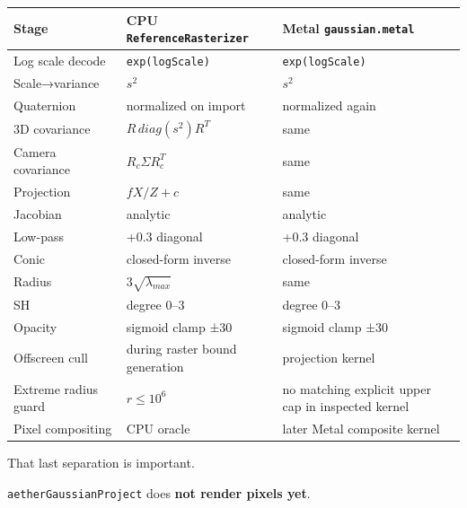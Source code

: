 {\def\LTcaptype{none} %
\begin{longtable}[]{@{}
  >{\raggedright\arraybackslash}p{}
  >{\raggedright\arraybackslash}p{}
  >{\raggedright\arraybackslash}p{}@{}}
\toprule\noalign{}
\begin{minipage}[b]{\linewidth}\raggedright
Stage
\end{minipage} & \begin{minipage}[b]{\linewidth}\raggedright
CPU \texttt{ReferenceRasterizer}
\end{minipage} & \begin{minipage}[b]{\linewidth}\raggedright
Metal \texttt{gaussian.metal}
\end{minipage} \\
\midrule\noalign{}
\endhead
\bottomrule\noalign{}
\endlastfoot
Log scale decode & \texttt{exp(logScale)} & \texttt{exp(logScale)} \\
Scale→variance & \(s^2\) & \(s^2\) \\
Quaternion & normalized on import & normalized again \\
3D covariance & \(R\,diag(s^2)R^T\) & same \\
Camera covariance & \(R_c\Sigma R_c^T\) & same \\
Projection & \(fX/Z+c\) & same \\
Jacobian & analytic & analytic \\
Low-pass & +0.3 diagonal & +0.3 diagonal \\
Conic & closed-form inverse & closed-form inverse \\
Radius & \(3\sqrt{\lambda_{max}}\) & same \\
SH & degree 0--3 & degree 0--3 \\
Opacity & sigmoid clamp ±30 & sigmoid clamp ±30 \\
Offscreen cull & during raster bound generation & projection kernel \\
Extreme radius guard & \(r\le10^6\) & no matching explicit upper cap in inspected kernel \\
Pixel compositing & CPU oracle & later Metal composite kernel \\
\end{longtable}
}

That last separation is important.

\texttt{aetherGaussianProject} does \textbf{not render pixels yet}.

